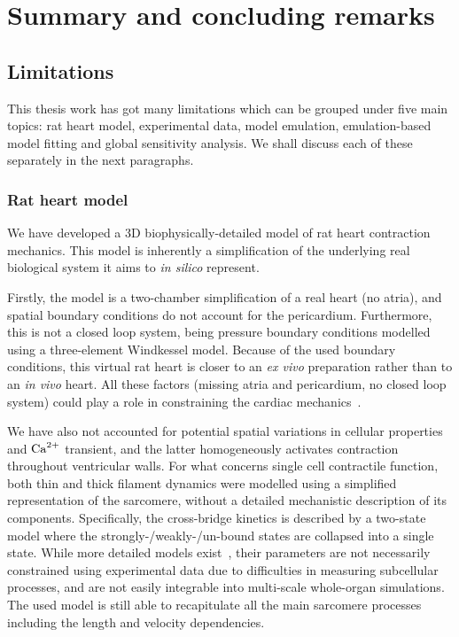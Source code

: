 \chapter{Summary and concluding remarks}\label{cha:chapter9}


%
%
%
\section{Limitations}\label{sec:ch9limitations}
This thesis work has got many limitations which can be grouped under five main topics: rat heart model, experimental data, model emulation, emulation-based model fitting and global sensitivity analysis. We shall discuss each of these separately in the next paragraphs.


%
%
%
\subsection{Rat heart model}\label{sec:ch9rat_heart_model}
We have developed a $3$D biophysically-detailed model of rat heart contraction mechanics. This model is inherently a simplification of the underlying real biological system it aims to \textit{in silico} represent.

\vspace{0.2cm}
Firstly, the model is a two-chamber simplification of a real heart (no atria), and spatial boundary conditions do not account for the pericardium. Furthermore, this is not a closed loop system, being pressure boundary conditions modelled using a three-element Windkessel model. Because of the used boundary conditions, this virtual rat heart is closer to an \textit{ex vivo} preparation rather than to an \textit{in vivo} heart. All these factors (missing atria and pericardium, no closed loop system) could play a role in constraining the cardiac mechanics~\cite{Strocchi:2020}.

\vspace{0.2cm}
We have also not accounted for potential spatial variations in cellular properties and $\textrm{Ca}^{2+}$ transient, and the latter homogeneously activates contraction throughout ventricular walls. For what concerns single cell contractile function, both thin and thick filament dynamics were modelled using a simplified representation of the sarcomere, without a detailed mechanistic description of its components. Specifically, the cross-bridge kinetics is described by a two-state model where the strongly-/weakly-/un-bound states are collapsed into a single state. While more detailed models exist~\cite{Land:2015}, their parameters are not necessarily constrained using experimental data due to difficulties in measuring subcellular processes, and are not easily integrable into multi-scale whole-organ simulations. The used model is still able to recapitulate all the main sarcomere processes including the length and velocity dependencies.


